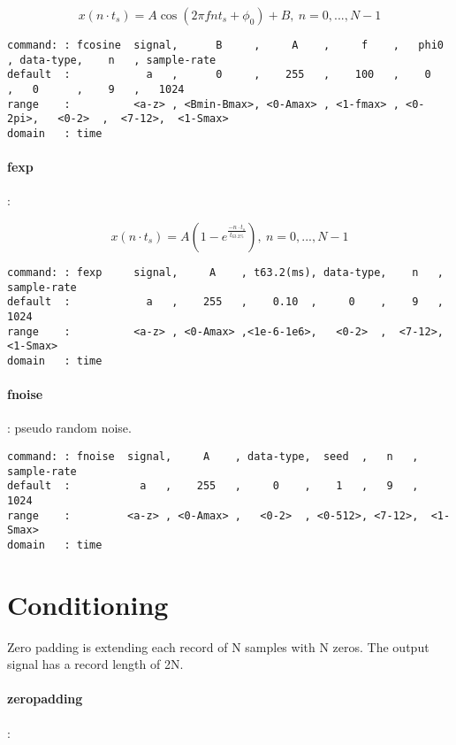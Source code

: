\documentclass{report}
\newcommand{\bc}{\scriptsize}
\newcommand{\ec}{\normalsize}
\begin{document}
\[ x(n \cdot t_{s}) = A \cos (2\pi fnt_{s} + \phi_{0})+B,~ n=0,...,N-1 \]

\bc
\begin{verbatim}
command: : fcosine  signal,      B     ,     A    ,     f    ,   phi0 , data-type,    n   , sample-rate
default  :            a   ,      0     ,    255   ,    100   ,    0   ,   0      ,    9   ,   1024
range    :          <a-z> , <Bmin-Bmax>, <0-Amax> , <1-fmax> , <0-2pi>,   <0-2>  ,  <7-12>,  <1-Smax>
domain   : time
\end{verbatim}
\ec

\paragraph{fexp}:

\[  x(n \cdot t_{s}) = A ( 1 - e^{\frac{-n\cdot t_{s}}{t_{63.2\%}}}),~ n=0,...,N-1 \]

\bc
\begin{verbatim}
command: : fexp     signal,     A    , t63.2(ms), data-type,    n   , sample-rate
default  :            a   ,    255   ,    0.10  ,     0    ,    9   ,       1024
range    :          <a-z> , <0-Amax> ,<1e-6-1e6>,   <0-2>  ,  <7-12>,  <1-Smax>
domain   : time
\end{verbatim}
\ec

\paragraph{fnoise}: pseudo random noise.

\bc
\begin{verbatim}
command: : fnoise  signal,     A    , data-type,  seed  ,   n   , sample-rate
default  :           a   ,    255   ,     0    ,    1   ,   9   ,    1024
range    :         <a-z> , <0-Amax> ,   <0-2>  , <0-512>, <7-12>,  <1-Smax>
domain   : time
\end{verbatim}
\ec

\section{Conditioning}

Zero padding is extending each record of N samples with N zeros.
The output signal has a record length of 2N.

\paragraph{zeropadding}:
\end{document}
